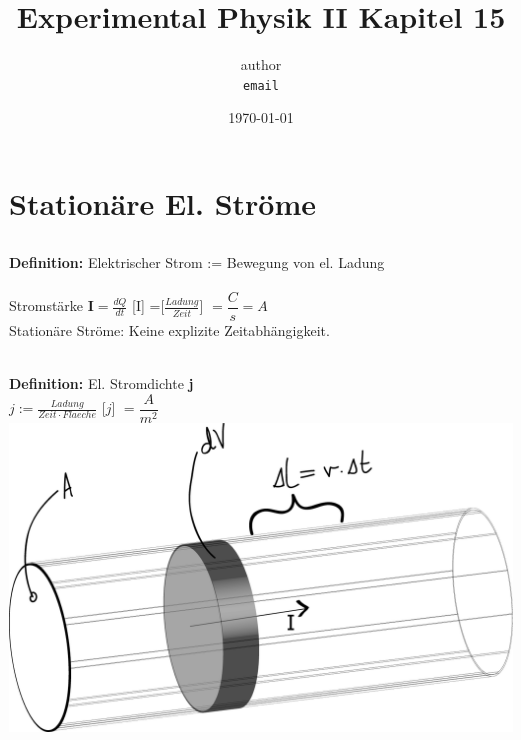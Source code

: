 \documentclass[11pt]{article}
\begin{document}
	\title{Experimental Physik II Kapitel 15}
		\author
		{
			author\\
			{\small 	\texttt{email}}
		}
		\date{\today}
	\maketitle
	\tableofcontents
	\setcounter{section}{14} %
	
	\newpage
	
\section{Stationäre El. Ströme }
	
	\subsection{}
		\textbf{Definition:} \hspace{1cm} Elektrischer Strom := Bewegung von el. Ladung \\
		\\
		Stromst\"{a}rke $\textbf{I} = \frac{dQ}{dt}$ [I] =[$\frac{Ladung}{Zeit}$] $=\dfrac{C}{s} = A$ \\
		Stationäre Ströme: Keine explizite Zeitabhängigkeit.\\ 
		\\
		\textbf{Definition:} \hspace{1cm} El. Stromdichte \textbf{j} \\
		$j:=\frac{Ladung}{Zeit\cdot Flaeche} $ [$j$] $=\dfrac{A}{m^2}$ \\
		\includegraphics[width=0.6\linewidth]{skizzen/15/VL06/15_1}
		\\
		
\end{document}
